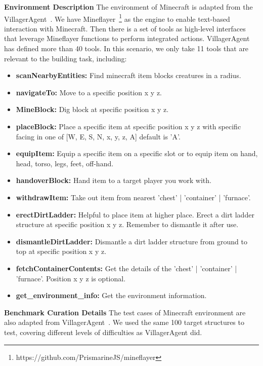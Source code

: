 \textbf{Environment Description}
The environment of Minecraft is adapted from the VillagerAgent~\cite{dong2024villageragentgraphbasedmultiagentframework}. We have Mineflayer~\footnote{https://github.com/PrismarineJS/mineflayer} as the engine to enable text-based interaction with Minecraft. Then there is a set of tools as high-level interfaces that leverage Mineflayer functions to perform integrated actions. VillagerAgent has defined more than 40 tools. In this scenario, we only take 11 tools that are relevant to the building task, including:
\begin{itemize}
    \item \textbf{scanNearbyEntities:} Find minecraft item blocks creatures in a radius.
    \item \textbf{navigateTo:} Move to a specific position x y z.
    \item \textbf{MineBlock:} Dig block at specific position x y z.
    \item \textbf{placeBlock:} Place a specific item at specific position x y z with specific facing in one of [W, E, S, N, x, y, z, A] default is 'A'.
    \item \textbf{equipItem:} Equip a specific item on a specific slot or to equip item on hand, head, torso, legs, feet, off-hand.
    \item \textbf{handoverBlock:} Hand item to a target player you work with.
    \item \textbf{withdrawItem:} Take out item from nearest 'chest' | 'container' | 'furnace'.
    \item \textbf{erectDirtLadder:} Helpful to place item at higher place. Erect a dirt ladder structure at specific position x y z. Remember to dismantle it after use.
    \item \textbf{dismantleDirtLadder:} Dismantle a dirt ladder structure from ground to top at specific position x y z.
    \item \textbf{fetchContainerContents:} Get the details of the 'chest' | 'container' | 'furnace'. Position x y z is optional.
    \item \textbf{get\_environment\_info:} Get the environment information.
\end{itemize}

\textbf{Benchmark Curation Details}
The test cases of Minecraft environment are also adapted from VillagerAgent~\cite{dong2024villageragentgraphbasedmultiagentframework}. We used the same 100 target structures to test, covering different levels of difficulties as VillagerAgent did.

